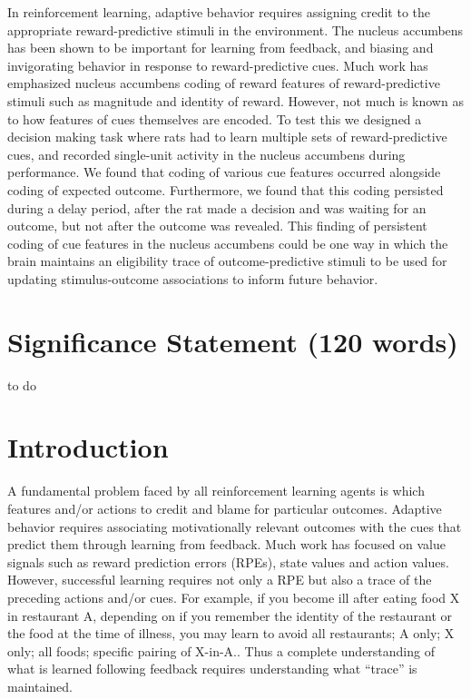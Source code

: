 \documentclass[11pt]{article}
\begin{document}
In reinforcement learning, adaptive behavior requires assigning credit to the appropriate reward-predictive stimuli in the environment. The nucleus accumbens has been shown to be important for learning from feedback, and biasing and invigorating behavior in response to reward-predictive cues. Much work has emphasized nucleus accumbens coding of reward features of reward-predictive stimuli such as magnitude and identity of reward. However, not much is known as to how features of cues themselves are encoded. To test this we designed a decision making task where rats had to learn multiple sets of reward-predictive cues, and recorded single-unit activity in the nucleus accumbens during performance. We found that coding of various cue features occurred alongside coding of expected outcome. Furthermore, we found that this coding persisted during a delay period, after the rat made a decision and was waiting for an outcome, but not after the outcome was revealed. This finding of persistent coding of cue features in the nucleus accumbens could be one way in which the brain maintains an eligibility trace of outcome-predictive stimuli to be used for updating stimulus-outcome associations to inform future behavior.

\section*{Significance Statement (120 words)}

to do

\newpage

\section*{Introduction}

A fundamental problem faced by all reinforcement learning agents is which features and/or actions to credit and blame for particular outcomes. Adaptive behavior requires associating motivationally relevant outcomes with the cues that predict them through learning from feedback. Much work has focused on value signals such as reward prediction errors (RPEs), state values and action values. However, successful learning requires not only a RPE but also a trace of the preceding actions and/or cues. For example, if you become ill after eating food X in restaurant A, depending on if you remember the identity of the restaurant or the food at the time of illness, you may learn to avoid {all restaurants; A only; X only; all foods; specific pairing of X-in-A.}. Thus a complete understanding of what is learned following feedback requires understanding what “trace” is maintained.
\end{document}

